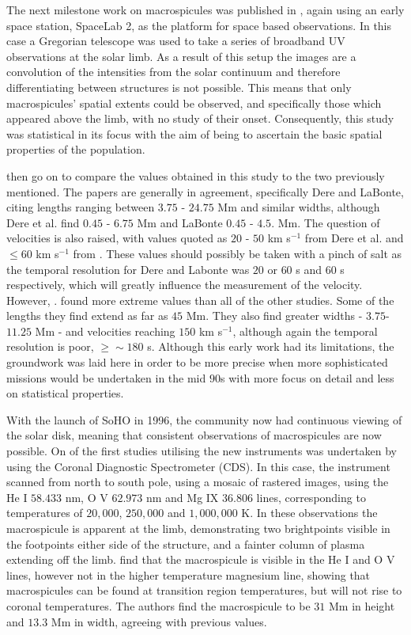The next milestone work on macrospicules was published in \cite{Dere89}, again using an early space station, SpaceLab 2, as the platform for space based observations.
In this case a Gregorian telescope was used to take a series of broadband UV observations at the solar limb.
As a result of this setup the images are a convolution of the intensities from the solar continuum and therefore differentiating between structures is not possible.
This means that only macrospicules' spatial extents could be observed, and specifically those which appeared above the limb, with no study of their onset.
Consequently, this study was statistical in its focus with the aim of being to ascertain the basic spatial properties of the population.

\cite{Dere89} then go on to compare the values obtained in this study to the two previously mentioned.
The papers are generally in agreement, specifically Dere and LaBonte, citing lengths ranging between $3.75$ - $24.75$ Mm and similar widths, although Dere et al. find $0.45$ - $6.75$ Mm and LaBonte $0.45$ - $4.5$. Mm.
The question of velocities is also raised, with values quoted as $20$ - $50$ km s${^{-1}}$ from Dere et al. and $\leq60$ km s${^{-1}}$ from \cite{LaBonte79}.
These values should possibly be taken with a pinch of salt as the temporal resolution for Dere and Labonte was $20$ or $60$ s and $60$ s respectively, which will greatly influence the measurement of the velocity.
However, \cite{Bohlin1975}. found more extreme values than all of the other studies.
Some of the lengths they find extend as far as $45$ Mm.
They also find greater widths - $3.75$-$11.25$ Mm - and velocities reaching $150$ km s${^{-1}}$, although again the temporal resolution is poor, $\geq \sim 180$ s.
Although this early work had its limitations, the groundwork was laid here in order to be more precise when more sophisticated missions would be undertaken in the mid $90$s with more focus on detail and less on statistical properties.

With the launch of SoHO in 1996, the community now had continuous viewing of the solar disk, meaning that consistent observations of macrospicules are now possible.
On of the first studies utilising the new instruments was undertaken by \cite{Pike1997} using the Coronal Diagnostic Spectrometer (CDS).
In this case, the instrument scanned from north to south pole, using a mosaic of rastered images, using the He I $58.433$ nm, O V $62.973$ nm and Mg IX $36.806$ lines, corresponding to temperatures of $20,000$, $250,000$ and $1,000,000$ K.
In these observations the macrospicule is apparent at the limb, demonstrating two brightpoints visible in the footpoints either side of the structure, and a fainter column of plasma extending off the limb.
\cite{Pike1997} find that the macrospicule is visible in the He I and O V lines, however not in the higher temperature magnesium line, showing that macrospicules can be found at transition region temperatures, but will not rise to coronal temperatures.
The authors find the macrospicule to be $31$ Mm in height and $13.3$ Mm in width, agreeing with previous values.

